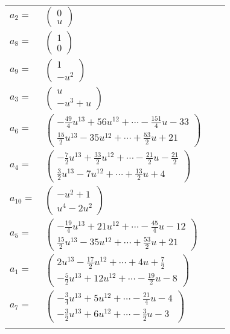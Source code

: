 \documentclass[1p]{elsarticle_modified}
\theoremstyle{definition}
\begin{document}
\begin{tabular}{m{7pt} m{180pt} m{7pt} m{180pt} }
\flushright $a_{2}=$&$\begin{pmatrix}0\\u\end{pmatrix}$ \\
\flushright $a_{8}=$&$\begin{pmatrix}1\\0\end{pmatrix}$ \\
\flushright $a_{9}=$&$\begin{pmatrix}1\\- u^2\end{pmatrix}$ \\
\flushright $a_{3}=$&$\begin{pmatrix}u\\- u^3+u\end{pmatrix}$ \\
\flushright $a_{6}=$&$\begin{pmatrix}-\frac{49}{4} u^{13}+56 u^{12}+\cdots-\frac{151}{4} u-33\\\frac{15}{2} u^{13}-35 u^{12}+\cdots+\frac{53}{2} u+21\end{pmatrix}$ \\
\flushright $a_{4}=$&$\begin{pmatrix}-\frac{7}{2} u^{13}+\frac{33}{2} u^{12}+\cdots-\frac{21}{2} u-\frac{21}{2}\\\frac{3}{2} u^{13}-7 u^{12}+\cdots+\frac{13}{2} u+4\end{pmatrix}$ \\
\flushright $a_{10}=$&$\begin{pmatrix}- u^2+1\\u^4-2 u^2\end{pmatrix}$ \\
\flushright $a_{5}=$&$\begin{pmatrix}-\frac{19}{4} u^{13}+21 u^{12}+\cdots-\frac{45}{4} u-12\\\frac{15}{2} u^{13}-35 u^{12}+\cdots+\frac{53}{2} u+21\end{pmatrix}$ \\
\flushright $a_{1}=$&$\begin{pmatrix}2 u^{13}-\frac{17}{2} u^{12}+\cdots+4 u+\frac{7}{2}\\-\frac{5}{2} u^{13}+12 u^{12}+\cdots-\frac{19}{2} u-8\end{pmatrix}$ \\
\flushright $a_{7}=$&$\begin{pmatrix}-\frac{3}{4} u^{13}+5 u^{12}+\cdots-\frac{21}{4} u-4\\-\frac{3}{2} u^{13}+6 u^{12}+\cdots-\frac{3}{2} u-3\end{pmatrix}$\\&\end{tabular}
\end{document}
